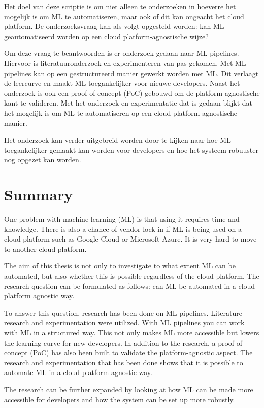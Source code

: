 Het doel van deze scriptie is om niet alleen te onderzoeken in hoeverre het mogelijk is om ML te automatiseren, maar ook of dit kan ongeacht het cloud platform. De onderzoeksvraag kan als volgt opgesteld worden: kan ML geautomatiseerd worden op een cloud platform-agnostische wijze?

Om deze vraag te beantwoorden is er onderzoek gedaan naar ML pipelines. Hiervoor is literatuuronderzoek en experimenteren van pas gekomen. Met ML pipelines kan op een gestructureerd manier gewerkt worden met ML. Dit verlaagt de leercurve en maakt ML toegankelijker voor nieuwe developers. Naast het onderzoek is ook een proof of concept (PoC) gebouwd om de platform-agnostische kant te valideren. Met het onderzoek en experimentatie dat is gedaan blijkt dat het mogelijk is om ML te automatiseren op een cloud platform-agnostische manier.

Het onderzoek kan verder uitgebreid worden door te kijken naar hoe ML toegankelijker gemaakt kan worden voor developers en hoe het systeem robuuster nog opgezet kan worden.

\newpage

\section*{Summary}
One problem with machine learning (ML) is that using it requires time and knowledge. There is also a chance of vendor lock-in if ML is being used on a cloud platform such as Google Cloud or Microsoft Azure. It is very hard to move to another cloud platform.

The aim of this thesis is not only to investigate to what extent ML can be automated, but also whether this is possible regardless of the cloud platform. The research question can be formulated as follows: can ML be automated in a cloud platform agnostic way.

To answer this question, research has been done on ML pipelines. Literature research and experimentation were utilized. With ML pipelines you can work with ML in a structured way. This not only makes ML more accessible but lowers the learning curve for new developers. In addition to the research, a proof of concept (PoC) has also been built to validate the platform-agnostic aspect. The research and experimentation that has been done shows that it is possible to automate ML in a cloud platform agnostic way.

The research can be further expanded by looking at how ML can be made more accessible for developers and how the system can be set up more robustly. 

\newpage